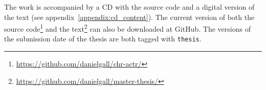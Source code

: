 The work is accompanied by a CD with the source code and a digital version of the text (see appendix~\ref{appendix:cd_content}). The current version of both the source code\footnote{\url{https://github.com/danielgall/chr-actr/}} and the text\footnote{\url{https://github.com/danielgall/master-thesis/}} can also be downloaded at GitHub. The versions of the submission date of the thesis are both tagged with \lstinline|thesis|.
